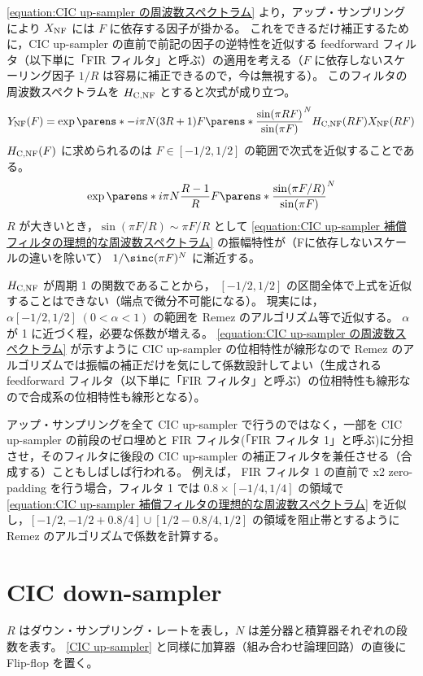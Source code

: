         \cref{equation:CIC up-sampler の周波数スペクトラム} より，アップ・サンプリングにより $X_\text{NF}$ には $F$ に依存する因子が掛かる。
        これをできるだけ補正するために，CIC up-sampler の直前で前記の因子の逆特性を近似する feedforward フィルタ（以下単に「FIR フィルタ」と呼ぶ）の適用を考える（$F$ に依存しないスケーリング因子 $1/R$ は容易に補正できるので，今は無視する）。
        このフィルタの周波数スペクトラムを $H_\text{C,NF}$ とすると次式が成り立つ。
        \[ \YNF(F) = \exp\parens*{-i\pi N(3R+1)F}\parens*{\frac{\sin(\pi R F)}{\sin(\pi F)}}^N \HCNF(R F)\XNF(R F) \]
        $H_\text{C,NF}(F)$ に求められるのは $F \in [-1/2,1/2]$ の範囲で次式を近似することである。
        \begin{equation}
            \exp\parens*{i\pi N\frac{R-1}{R}F}\parens*{\frac{\sin(\pi F/R)}{\sin(\pi F)}}^N \label{equation:CIC up-sampler 補償フィルタの理想的な周波数スペクトラム}
        \end{equation}
        $R$ が大きいとき，$\sin(\pi F/R) \sim \pi F/R$ として \cref{equation:CIC up-sampler 補償フィルタの理想的な周波数スペクトラム} の振幅特性が（Fに依存しないスケールの違いを除いて） $1/\sinc(\pi F)^N$ に漸近する。
        \par
        $H_\text{C,NF}$ が周期 1 の関数であることから， $[-1/2,1/2]$ の区間全体で上式を近似することはできない（端点で微分不可能になる）。
        現実には，$\alpha[-1/2,1/2]\;(0<\alpha<1)$ の範囲を Remez のアルゴリズム等で近似する。
        $\alpha$ が 1 に近づく程，必要な係数が増える。
        \cref{equation:CIC up-sampler の周波数スペクトラム} が示すように CIC up-sampler の位相特性が線形なので Remez のアルゴリズムでは振幅の補正だけを気にして係数設計してよい（生成される feedforward フィルタ（以下単に「FIR フィルタ」と呼ぶ）の位相特性も線形なので合成系の位相特性も線形となる）。
        \par
        アップ・サンプリングを全て CIC up-sampler で行うのではなく，一部を CIC up-sampler の前段のゼロ埋めと FIR フィルタ(「FIR フィルタ 1」と呼ぶ)に分担させ，そのフィルタに後段の CIC up-sampler の補正フィルタを兼任させる（合成する）こともしばしば行われる。
        例えば， FIR フィルタ 1 の直前で x2 zero-padding を行う場合，フィルタ 1 では $0.8\times[-1/4,1/4]$ の領域で \cref{equation:CIC up-sampler 補償フィルタの理想的な周波数スペクトラム} を近似し，$[-1/2,-1/2+0.8/4]\cup[1/2-0.8/4,1/2]$ の領域を阻止帯とするように Remez のアルゴリズムで係数を計算する。
\section{CIC down-sampler}
    $R$ はダウン・サンプリング・レートを表し，$N$ は差分器と積算器それぞれの段数を表す。
    \ref{CIC up-sampler} と同様に加算器（組み合わせ論理回路）の直後に Flip-flop を置く。
